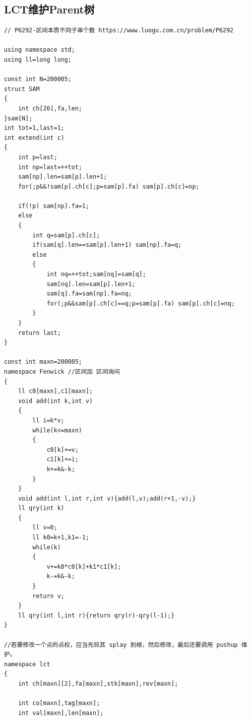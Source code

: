 \subsection{LCT维护Parent树}
\begin{verbatim}
// P6292-区间本质不同子串个数 https://www.luogu.com.cn/problem/P6292

using namespace std;
using ll=long long;

const int N=200005;
struct SAM
{
    int ch[26],fa,len;
}sam[N];
int tot=1,last=1;
int extend(int c)
{   
    int p=last;
    int np=last=++tot;
    sam[np].len=sam[p].len+1;
    for(;p&&!sam[p].ch[c];p=sam[p].fa) sam[p].ch[c]=np;

    if(!p) sam[np].fa=1;
    else
    {
        int q=sam[p].ch[c];
        if(sam[q].len==sam[p].len+1) sam[np].fa=q;
        else
        {
            int nq=++tot;sam[nq]=sam[q];
            sam[nq].len=sam[p].len+1;
            sam[q].fa=sam[np].fa=nq;
            for(;p&&sam[p].ch[c]==q;p=sam[p].fa) sam[p].ch[c]=nq;
        }
    } 
    return last;
}

const int maxn=200005;
namespace Fenwick //区间加 区间询问
{
    ll c0[maxn],c1[maxn];
    void add(int k,int v)
    {
        ll i=k*v;
        while(k<=maxn)
        {
            c0[k]+=v;
            c1[k]+=i;
            k+=k&-k;
        }
    }
    void add(int l,int r,int v){add(l,v);add(r+1,-v);}
    ll qry(int k)
    {
        ll v=0;
        ll k0=k+1,k1=-1;
        while(k)
        {
            v+=k0*c0[k]+k1*c1[k];
            k-=k&-k;
        }
        return v;
    }
    ll qry(int l,int r){return qry(r)-qry(l-1);}
}

//若要修改一个点的点权，应当先将其 splay 到根，然后修改，最后还要调用 pushup 维护。
namespace lct
{
    int ch[maxn][2],fa[maxn],stk[maxn],rev[maxn];

    int co[maxn],tag[maxn];
    int val[maxn],len[maxn];


\end{verbatim}
